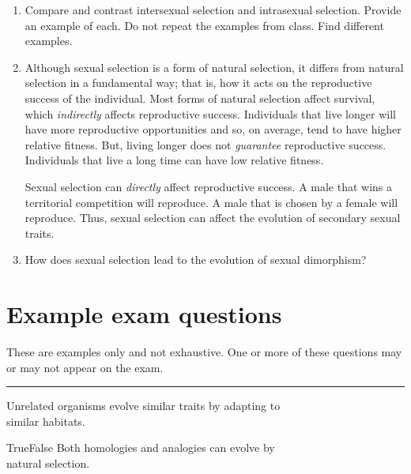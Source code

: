 \documentclass[letterpaper]{tufte-handout}
\begin{document}
\begin{enumerate}
	\item Compare and contrast intersexual selection and intrasexual selection. Provide an example of each. Do not repeat the examples from class. Find different examples.   

	\item Although sexual selection is a form of natural selection, it differs from natural selection in a fundamental way; that is, how it acts on the reproductive success of the individual. Most forms of natural selection affect survival, which \emph{indirectly} affects reproductive success. Individuals that live longer will have more reproductive opportunities and so, on average, tend to have higher relative fitness. But, living longer does not \emph{guarantee} reproductive success. Individuals that live a long time can have low relative fitness.   
	
	Sexual selection can \emph{directly} affect reproductive success. A male that wins a territorial competition will reproduce. A male that is chosen by a female will reproduce. Thus, sexual selection can affect the evolution of secondary sexual traits.
	
	\item How does sexual selection lead to the evolution of sexual dimorphism?



\end{enumerate}

\section*{Example exam questions}

These are examples only and not exhaustive. One or more of these questions may or may not appear on the exam.

\bigskip

\noindent \rule{1in}{0.4pt} Unrelated organisms evolve similar traits by adapting to\\
\noindent\hspace*{1in} similar habitats.

\bigskip

\noindent True\hspace{1em}False\hspace{1em} Both homologies and analogies can evolve by \\
\noindent {}  natural selection.
\end{document}
